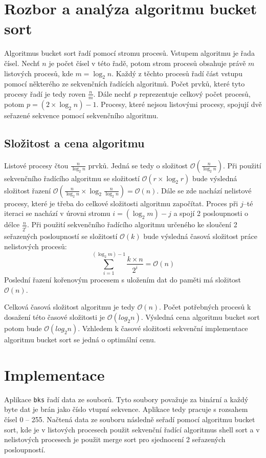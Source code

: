 \documentclass[11pt,a4paper,titlepage]{article}
\begin{document}
    \section{Rozbor a analýza algoritmu bucket sort}
        Algoritmus bucket sort řadí pomocí stromu procesů. Vstupem algoritmu je řada čísel.
        Nechť $n$ je počet čísel v této řadě, potom strom procesů obsahuje právě $m$ listových
        procesů, kde $m = \log_2 n$. Každý z těchto procesů řadí část vstupu pomocí některého
        ze sekvenčních řadících algoritmů. Počet prvků, které tyto procesy řadí je tedy roven $\frac{n}{m}$.
        Dále nechť $p$ reprezentuje celkový počet procesů, potom $p = (2 \times \log_2 n) - 1$.
        Procesy, které nejsou listovými procesy, spojují dvě seřazené sekvence pomocí
        sekvenčního algoritmu.
        
        \subsection{Složitost a cena algoritmu}
        Listové procesy čtou $\frac{n}{\log_2 n}$ prvků. Jedná se tedy o složitost $\mathcal{O}(\frac{n}{\log_2 n})$.
        Při použití sekvenčního řadícího algoritmu se složitostí $\mathcal{O}(r \times \log_2 r)$ bude výsledná složitost
        řazení $\mathcal{O}(\frac{n}{\log_2 n} \times \log_2 \frac{n}{\log_2 n}) = \mathcal{O}(n)$. Dále se zde nachází
        nelistové procesy, které je třeba do celkové složitosti algoritmu započítat. Proces při $j$--té iteraci se nachází
        v úrovni stromu $i = (\log_2 m) - j$ a spojí 2 posloupnosti o délce $\frac{n}{2^i}$. Při použití sekvenčního řadícího
        algoritmu určeného ke sloučení 2 seřazených posloupností se složitostí $\mathcal{O}(k)$ bude výsledná časová složitost
        práce nelistových procesů:
        $$\sum_{i=1}^{(\log_2 m) - 1} \frac{k \times n}{2^i} = \mathcal{O}(n)$$
        Poslední řazení kořenovým procesem s uložením dat do paměti má složitost $\mathcal{O}(n)$.
        
        Celková časová složitost algoritmu je tedy $\mathcal{O}(n)$. Počet potřebných procesů k dosažení této
        časové složitosti je $\mathcal{O}(log_2 n)$. Výsledná cena algoritmu bucket sort potom bude $\mathcal{O}(log_2 n)$.
        Vzhledem k časové složitosti sekvenční implementace algoritmu bucket sort se jedná o optimální cenu.

	\section{Implementace}
        Aplikace \texttt{bks} řadí data ze souborů. Tyto soubory považuje za binární a každý byte dat je brán jako číslo vtupní sekvence.
        Aplikace tedy pracuje s rozsahem čísel 0 -- 255. Načtená data ze souboru následně seřadí pomocí algoritmu bucket sort,
        kde je v listových procesech použit sekvenční řadící algoritmus shell sort a v nelistových procesech je použit
        merge sort pro sjednocení 2 seřazených posloupností.
        
\end{document}
